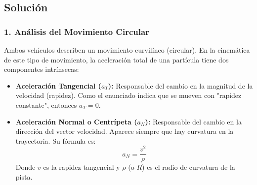 \documentclass[12pt, a4paper]{article}
\begin{document}
\begin{center}
\end{center}


\subsection*{Solución}

\subsubsection*{1. Análisis del Movimiento Circular}
Ambos vehículos describen un movimiento curvilíneo (circular). En la cinemática de este tipo de movimiento, la aceleración total de una partícula tiene dos componentes intrínsecas:
\begin{itemize}
    \item \textbf{Aceleración Tangencial ($a_T$):} Responsable del cambio en la magnitud de la velocidad (rapidez). Como el enunciado indica que se mueven con "rapidez constante", entonces $a_T = 0$.
    \item \textbf{Aceleración Normal o Centrípeta ($a_N$):} Responsable del cambio en la dirección del vector velocidad. Aparece siempre que hay curvatura en la trayectoria. Su fórmula es:
    $$ a_N = \frac{v^2}{\rho} $$
    Donde $v$ es la rapidez tangencial y $\rho$ (o $R$) es el radio de curvatura de la pista.
\end{itemize}
\end{document}
